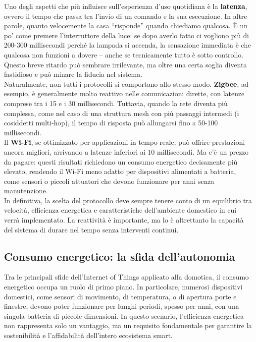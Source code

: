 Uno degli aspetti che più influisce sull’esperienza d’uso quotidiana è la \textbf{latenza}, ovvero il tempo che passa tra l’invio di un comando e la sua esecuzione. In altre parole, quanto velocemente la casa “risponde” quando chiediamo qualcosa. È un po’ come premere l’interruttore della luce: se dopo averlo fatto ci vogliono più di 200-300 millisecondi perché la lampada si accenda, la sensazione immediata è che qualcosa non funzioni a dovere – anche se tecnicamente tutto è sotto controllo. Questo breve ritardo può sembrare irrilevante, ma oltre una certa soglia diventa fastidioso e può minare la fiducia nel sistema.\\

Naturalmente, non tutti i protocolli si comportano allo stesso modo. \textbf{Zigbee}, ad esempio, è generalmente molto reattivo nelle comunicazioni dirette, con latenze comprese tra i 15 e i 30 millisecondi. Tuttavia, quando la rete diventa più complessa, come nel caso di una struttura mesh con più passaggi intermedi (i cosiddetti multi-hop), il tempo di risposta può allungarsi fino a 50-100 millisecondi.\\

Il \textbf{Wi-Fi}, se ottimizzato per applicazioni in tempo reale, può offrire prestazioni ancora migliori, arrivando a latenze inferiori ai 10 millisecondi. Ma c’è un prezzo da pagare: questi risultati richiedono un consumo energetico decisamente più elevato, rendendo il Wi-Fi meno adatto per dispositivi alimentati a batteria, come sensori o piccoli attuatori che devono funzionare per anni senza manutenzione.\\

In definitiva, la scelta del protocollo deve sempre tenere conto di un equilibrio tra velocità, efficienza energetica e caratteristiche dell’ambiente domestico in cui verrà implementato. La reattività è importante, ma lo è altrettanto la capacità del sistema di durare nel tempo senza interventi continui.


\subsection{Consumo energetico: la sfida dell’autonomia}

Tra le principali sfide dell’Internet of Things applicato alla domotica, il consumo energetico occupa un ruolo di primo piano. In particolare, numerosi dispositivi domestici, come sensori di movimento, di temperatura, o di apertura porte e finestre, devono poter funzionare per lunghi periodi, spesso per anni, con una singola batteria di piccole dimensioni. In questo scenario, l’efficienza energetica non rappresenta solo un vantaggio, ma un requisito fondamentale per garantire la sostenibilità e l’affidabilità dell’intero ecosistema smart.

